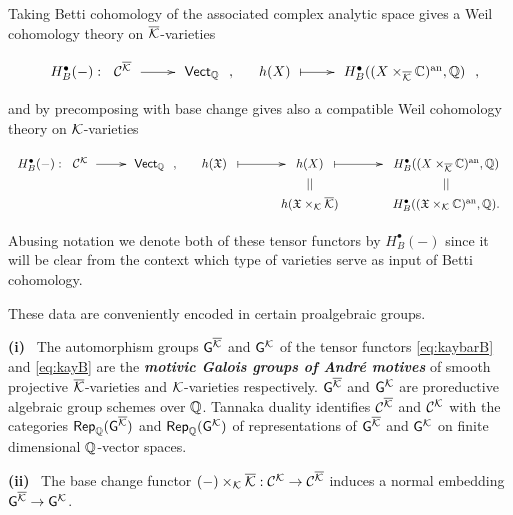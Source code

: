\documentclass[twoside,leqno]{article}
\numberwithin{equation}{section}
\theoremstyle{plain}
\theoremstyle{definition}
\begin{document}
Taking Betti cohomology of the associated complex analytic space gives
a Weil cohomology theory on $\overline{\mathcal K}$-varieties \cite{stacksproject}
\begin{equation} \label{eq:kaybarB}
\xymatrix@1@M+0.5pc{
  H^{\bullet}_{B}(-) : \hspace{-2.4pc} &
  \CA{\kaybar}  \ar[r] &  \mathsf{Vect}_{\bbQ}}, \quad
\xymatrix@1@M+0.5pc{h(X) \ar@{|->}[r] & 
H^{\bullet}_{B}((X\times_{\kaybar}\bbC)^{\op{an}},\bbQ)},
\end{equation}
and by precomposing with base change gives also a compatible Weil
cohomology theory on $\mathcal K$-varieties
\begin{equation} \label{eq:kayB}
  \xymatrix@1@M+0.5pc{
    H^{\bullet}_{B}(-) : \hspace{-2.4pc} &
    \CA{\kay}  \ar[r] & \mathsf{Vect}_{\bbQ}}, \quad
  \xymatrix@R-3pc@M+0.5pc@C+0.2pc{
    h(\mathfrak{X}) \ar@{|->}[r] &  h(X) \ar@{|->}[r] &
    H^{\bullet}_{B}((X\times_{\kaybar}\bbC)^{\op{an}},\bbQ) \\
    & || & || \\
    & h(\mathfrak{X}\times_{\kay} \kaybar) &
    H^{\bullet}_{B}((\mathfrak{X}\times_{\kay}\bbC)^{\op{an}},\bbQ).
    }
\end{equation}
Abusing notation we denote both of these tensor functors by
$H^{\bullet}_{B}(-)$ since it will be clear from the context which
type of varieties serve as input of Betti cohomology. 

These data are conveniently encoded in  certain proalgebraic groups.  

\medskip

\noindent
{\bfseries (i)} \ The automorphism groups $\mathsf{G}^{\overline{\mathcal K}}$ and
$\mathsf{G}^{\mathcal K}$ of the tensor functors \eqref{eq:kaybarB} and
\eqref{eq:kayB} are the \emph{\bfseries motivic Galois groups of
  Andr\'{e} motives} of smooth projective $\overline{\mathcal K}$-varieties and
$\mathcal K$-varieties respectively.  $\mathsf{G}^{\overline{\mathcal K}}$ and $\mathsf{G}^{\mathcal K}$ are
proreductive algebraic group schemes over $\mathbb Q$. Tannaka duality
identifies $\mathcal{C}^{\overline{\mathcal K}}$ and $\mathcal{C}^{\mathcal K}$ with the categories
$\mathsf{Rep}_{\mathbb Q}(\mathsf{G}^{\overline{\mathcal K}})$ and
$\mathsf{Rep}_{\mathbb Q}(\mathsf{G}^{\mathcal K})$ of representations of $\mathsf{G}^{\overline{\mathcal K}}$
and $\mathsf{G}^{\mathcal K}$ on finite dimensional $\mathbb Q$-vector spaces.

\medskip

\noindent
{\bfseries (ii)} \ The base change functor $(-)\times_{\mathcal K} \overline{\mathcal K} :
\mathcal{C}^{\mathcal K} \to \mathcal{C}^{\overline{\mathcal K}}$ induces a normal embedding
$\mathsf{G}^{\overline{\mathcal K}} \to \mathsf{G}^{\mathcal K}$.

\medskip
\end{document}
